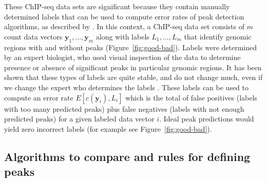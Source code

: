 \documentclass[twoside,11pt]{article}
\begin{document}
These ChIP-seq data sets are significant because they contain manually
determined labels that can be used to compute error rates of peak
detection algorithms, as described by \citet{HOCKING2016-chipseq}. In
this context, a ChIP-seq data set consists of $m$ count data vectors
$\mathbf y_1,\dots,\mathbf y_m$ along with labels $L_1,\dots, L_m$
that identify genomic regions with and without peaks
(Figure~\ref{fig:good-bad}). Labels were determined by an expert
biologist, who used visual inspection of the data to determine
presence or absence of significant peaks in particular genomic
regions. It has been shown that these types of labels are quite
stable, and do not change much, even if we change the expert who
determines the labels \citep{HOCKING2016-chipseq}. These labels can
be used to compute an error rate $E[c(\mathbf y_i), L_i]$ which is the
total of false positives (labels with too many predicted peaks) plus
false negatives (labels with not enough predicted peaks) for a given
labeled data vector $i$. Ideal peak predictions would yield zero
incorrect labels (for example see Figure~\ref{fig:good-bad}).

\subsection{Algorithms to compare and rules for defining peaks}
\end{document}
